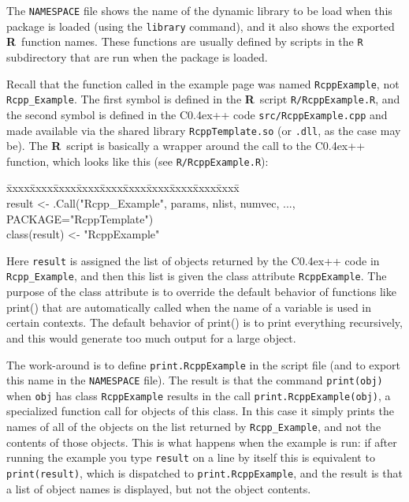 \documentclass{article}
\newenvironment{program}{\ttfamily\begin{tabbing}
\=xxxx\=xxxx\=xxxx\=xxxx\=xxxx\=xxxx\=xxxx\=xxxx\=xxxx\=xxxx\= \+ \kill \\
}{\end{tabbing}}
\def\C++{C{\raise 0.4ex\hbox{\tiny ++}}}
\newcommand{\R}{{\bf R}}
\begin{document}
The {\tt NAMESPACE} file shows the name of the dynamic library to
be load when this package is loaded (using the {\tt library} command),
and it also shows the exported \R\ function names. These functions
are usually defined by scripts in the {\tt R} subdirectory that are
run when the package is loaded.

Recall that the function called in the example page was named
{\tt RcppExample}, not {\tt Rcpp\_Example}. The first symbol is
defined in the \R\ script {\tt R/RcppExample.R}, and the second
symbol is defined in the \C++ code
{\tt src/RcppExample.cpp} and made available via the shared library
{\tt RcppTemplate.so} (or {\tt .dll}, as the case may be). The \R\
script is basically a wrapper around the call to the \C++ function,
which looks like this (see {\tt R/RcppExample.R}):
\begin{program}
  result <- .Call("Rcpp\_Example", params, nlist, numvec, ...,\\
               PACKAGE="RcppTemplate") \\
  class(result) <- "RcppExample"
\end{program}

Here {\tt result} is assigned the list of objects returned by the \C++
code in {\tt Rcpp\_Example}, and then this list is given the class
attribute {\tt RcppExample}. The purpose of the class attribute is
to override the default behavior of functions like print() that are
automatically called when the name of a variable is used in certain
contexts. The default behavior of print() is to print everything
recursively, and this would generate too much output for a large
object.

The work-around is to define {\tt print.RcppExample} in the script file
(and to export this name in the  {\tt NAMESPACE} file). The result is that
the command {\tt print(obj)} when {\tt obj} has class {\tt RcppExample}
results in the call {\tt print.RcppExample(obj)}, a specialized function
call for objects of this class. In this case it simply prints the names
of all of the objects on the list returned by {\tt Rcpp\_Example}, and
not the contents of those objects. This is what happens when the
example is run: if after running the example you type {\tt result} on
a line by itself this is equivalent to {\tt print(result)}, which is
dispatched to {\tt print.RcppExample}, and the result is that a list
of object names is displayed, but not the object contents.
\end{document}
